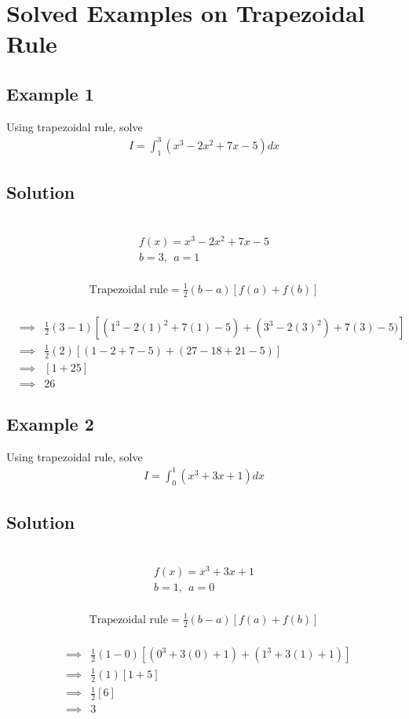 \documentclass[12pt]{report}
\newcommand{\sps}{\\[0.2cm]}
\begin{document}
	\section{Solved Examples on Trapezoidal Rule}
	\subsection{Example 1}
	Using trapezoidal rule, solve
	\begin{eqnarray*}
		I = \int_1^3\left(x^3 - 2x^2 + 7x - 5\right)dx
	\end{eqnarray*}
	
	\subsection*{Solution}
	{~}\\[-2.1cm]
	\begin{gather*}
		f(x) = x^3 - 2x^2 + 7x - 5\sps
		b=3,~~ a=1
	\end{gather*}
	{~}\\[-2.1cm]
	\begin{gather*}
		\text{Trapezoidal rule} = \frac{1}{2}(b-a)[f(a) + f(b)]
	\end{gather*}
	{~}\\[-2.1cm]
	\begin{eqnarray*}
		&\implies&\frac{1}{2}(3-1)\left[(1^3-2(1)^2 + 7(1)-5) + (3^3 - 2(3)^2) + 7(3) - 5)\right] \sps
		&\implies&\frac{1}{2}(2)\left[(1-2+7-5) + (27-18 + 21-5)\right]\sps
		&\implies&[1+25]\sps
		&\implies& 26
	\end{eqnarray*}
	
	\subsection{Example 2}
	Using trapezoidal rule, solve
	\begin{eqnarray*}
		I = \int_0^1\left(x^3 + 3x + 1\right)dx
	\end{eqnarray*}
	
	\subsection*{Solution}
	{~}\\[-2.1cm]
	\begin{gather*}
		f(x) = x^3 + 3x + 1\sps
		b=1,~~ a=0
	\end{gather*}
	{~}\\[-2.1cm]
	\begin{gather*}
		\text{Trapezoidal rule} = \frac{1}{2}(b-a)[f(a) + f(b)]
	\end{gather*}
	{~}\\[-2.1cm]
	\begin{eqnarray*}
		&\implies&\frac{1}{2}(1-0)[(0^3 + 3(0) + 1) + (1^3 + 3(1) + 1)]\sps
		&\implies& \frac{1}{2}(1)[1+5]\sps
		&\implies&\frac{1}{2}[6]\sps
		&\implies& 3
	\end{eqnarray*}
	
\end{document}
